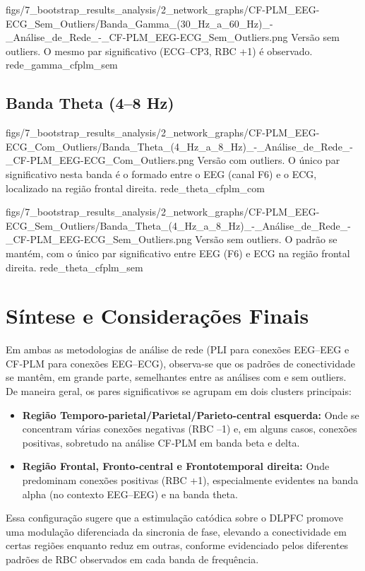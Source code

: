 \standardfigure
{figs/7_bootstrap_results_analysis/2_network_graphs/CF-PLM_EEG-ECG_Sem_Outliers/Banda_Gamma_(30_Hz_a_60_Hz)_-_Análise_de_Rede_-_CF-PLM_EEG-ECG_Sem_Outliers.png}
{Versão sem outliers. O mesmo par significativo (ECG–CP3, RBC +1) é observado.}
{rede_gamma_cfplm_sem}


\subsection{Banda Theta (4–8 Hz)}
\standardfigure
{figs/7_bootstrap_results_analysis/2_network_graphs/CF-PLM_EEG-ECG_Com_Outliers/Banda_Theta_(4_Hz_a_8_Hz)_-_Análise_de_Rede_-_CF-PLM_EEG-ECG_Com_Outliers.png}
{Versão com outliers. O único par significativo nesta banda é o formado entre o EEG (canal F6) e o ECG, localizado na região frontal direita.}
{rede_theta_cfplm_com}

\standardfigure
{figs/7_bootstrap_results_analysis/2_network_graphs/CF-PLM_EEG-ECG_Sem_Outliers/Banda_Theta_(4_Hz_a_8_Hz)_-_Análise_de_Rede_-_CF-PLM_EEG-ECG_Sem_Outliers.png}
{Versão sem outliers. O padrão se mantém, com o único par significativo entre EEG (F6) e ECG na região frontal direita.}
{rede_theta_cfplm_sem}


\section{Síntese e Considerações Finais}

Em ambas as metodologias de análise de rede (PLI para conexões EEG–EEG e CF‐PLM para conexões EEG–ECG), observa-se que os padrões de conectividade se mantêm, em grande parte, semelhantes entre as análises com e sem outliers. De maneira geral, os pares significativos se agrupam em dois clusters principais: 
\begin{itemize}
    \item \textbf{Região Temporo-parietal/Parietal/Parieto-central esquerda:} Onde se concentram várias conexões negativas (RBC –1) e, em alguns casos, conexões positivas, sobretudo na análise CF‐PLM em banda beta e delta.
    \item \textbf{Região Frontal, Fronto-central e Frontotemporal direita:} Onde predominam conexões positivas (RBC +1), especialmente evidentes na banda alpha (no contexto EEG–EEG) e na banda theta.
\end{itemize}

Essa configuração sugere que a estimulação catódica sobre o DLPFC promove uma modulação diferenciada da sincronia de fase, elevando a conectividade em certas regiões enquanto reduz em outras, conforme evidenciado pelos diferentes padrões de RBC observados em cada banda de frequência.

